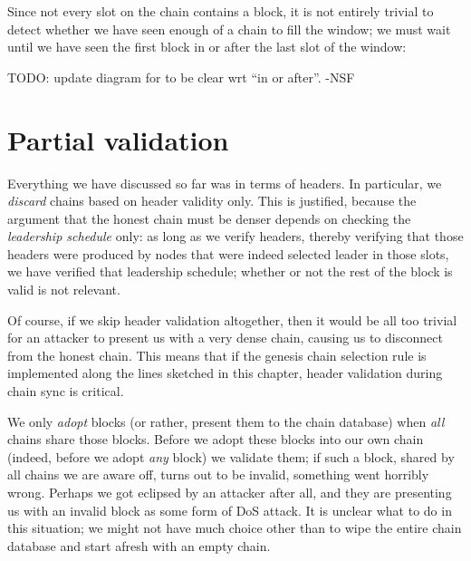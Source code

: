 Since not every slot on the chain contains a block, it is not entirely trivial
to detect whether we have seen enough of a chain to fill the window; we must
wait until we have seen the first block in or after the last slot of the window:
%
\begin{center}
\end{center}

 TODO: update diagram for to be clear wrt ``in or after''. -NSF

\section{Partial validation}

Everything we have discussed so far was in terms of headers. In particular,
we \emph{discard} chains based on header validity only. This is justified,
because the argument that the honest chain must be denser depends on checking
the \emph{leadership schedule} only: as long as we verify headers, thereby
verifying that those headers were produced by nodes that were indeed selected
leader in those slots, we have verified that leadership schedule; whether or
not the rest of the block is valid is not relevant.

Of course, if we skip header validation altogether, then it would be all too
trivial for an attacker to present us with a very dense chain, causing us to
disconnect from the honest chain. This means that if  the genesis chain
selection rule is implemented along the lines sketched in this chapter, header
validation during chain sync is critical.

We only \emph{adopt} blocks (or rather, present them to the chain database) when
\emph{all} chains share those blocks. Before we adopt these blocks into our own
chain (indeed, before we adopt \emph{any} block) we validate them; if such a
block, shared by all chains we are aware off, turns out to be invalid, something
went horribly wrong. Perhaps we got eclipsed by an attacker after all, and they
are presenting us with an invalid block as some form of DoS attack. It is
unclear what to do in this situation; we might not have much choice other than
to wipe the entire chain database and start afresh with an empty chain.

